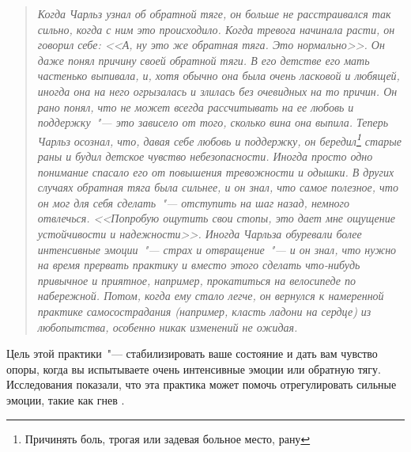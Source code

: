 \begin{quotation}
	\textit{
		Когда Чарльз узнал об обратной тяге, он больше не расстраивался так сильно, когда с ним это происходило. Когда тревога начинала расти, он говорил себе: <<А, ну это же обратная тяга. Это нормально>>. Он даже понял причину своей обратной тяги. В его детстве его мать частенько выпивала, и, хотя обычно она была очень ласковой и любящей, иногда она на него огрызалась и злилась без очевидных на то причин. Он рано понял, что не может всегда рассчитывать на ее любовь и поддержку~"--- это зависело от того, сколько вина она выпила. Теперь Чарльз осознал, что, давая себе любовь и поддержку, он бередил\footnote{Причинять боль, трогая или задевая больное место, рану} старые раны и будил детское чувство небезопасности. Иногда просто одно понимание спасало его от повышения тревожности и одышки. В других случаях обратная тяга была сильнее, и он знал, что самое полезное, что он мог для себя сделать~"--- отступить на шаг назад, немного отвлечься. <<Попробую ощутить свои стопы, это дает мне ощущение устойчивости и надежности>>. Иногда Чарльза обуревали более интенсивные эмоции~"--- страх и отвращение~"--- и он знал, что нужно на время прервать практику и вместо этого сделать что-нибудь привычное и приятное, например, прокатиться на велосипеде по набережной. Потом, когда ему стало легче, он вернулся к намеренной практике самосострадания (например, класть ладони на сердце) из любопытства, особенно никак изменений не ожидая.
	}
\end{quotation}

\newpage
{}\label{IP:Feeling_the_Soles_of_Your_Feet}

Цель этой практики~"--- стабилизировать ваше состояние и дать вам чувство опоры, когда вы испытываете очень интенсивные эмоции или обратную тягу. Исследования показали, что эта практика может помочь отрегулировать сильные эмоции, такие как гнев \cite{64}.

